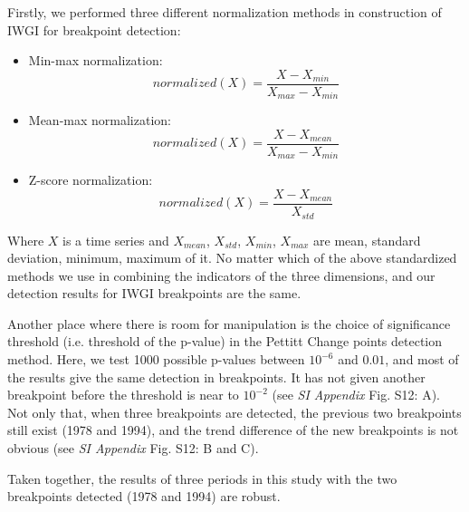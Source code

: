 \documentclass[9pt,twoside,lineno]{pnas-new}
\begin{document}
Firstly, we performed three different normalization methods in construction of IWGI for breakpoint detection:

\begin{itemize}
    \item Min-max normalization:
        $$ normalized(X) = \frac{X - X_{min}}{X_{max} - X_{min}} $$
    \item Mean-max normalization:
        $$ normalized(X) = \frac{X - X_{mean}}{X_{max} - X_{min}} $$
    \item Z-score normalization:
        $$ normalized(X) = \frac{X-X_{mean}}{X_{std}} $$
\end{itemize}

Where $X$ is a time series and $X_{mean}$, $X_{std}$, $X_{min}$, $X_{max}$ are mean, standard deviation, minimum, maximum of it.
No matter which of the above standardized methods we use in combining the indicators of the three dimensions, and our detection results for IWGI breakpoints are the same.

Another place where there is room for manipulation is the choice of significance threshold (i.e. threshold of the p-value) in the Pettitt Change points detection method. Here, we test 1000 possible p-values between $10^{-6}$ and $0.01$, and most of the results give the same detection in breakpoints.
It has not given another breakpoint before the threshold is near to $10^{-2}$ (see \textit{SI Appendix} Fig. S12: A).
Not only that, when three breakpoints are detected, the previous two breakpoints still exist (1978 and 1994), and the trend difference of the new breakpoints is not obvious (see \textit{SI Appendix} Fig. S12: B and C).

Taken together, the results of three periods in this study with the two breakpoints detected (1978 and 1994) are robust.

\end{document}
